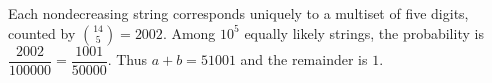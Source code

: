Each nondecreasing string corresponds uniquely to a multiset of five digits, counted by $\binom{14}{5}=2002$. Among $10^5$ equally likely strings, the probability is $\dfrac{2002}{100000}=\dfrac{1001}{50000}$. Thus $a+b=51001$ and the remainder is $\boxed1$.
